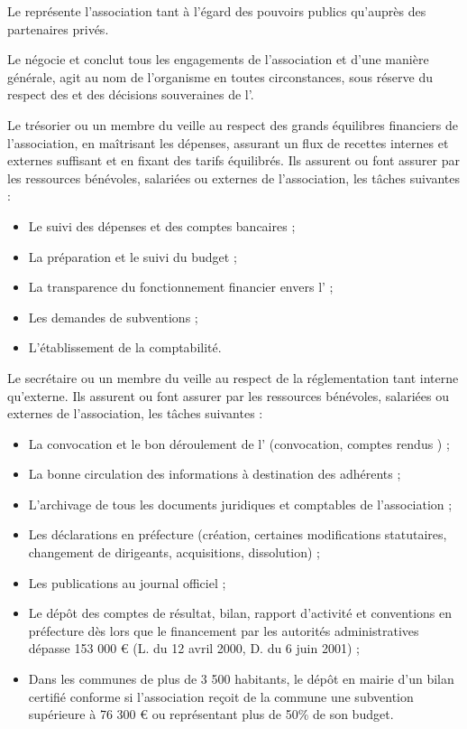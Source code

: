 Le \bureau{} représente l'association tant à l'égard des pouvoirs publics qu'auprès des partenaires privés.

Le \bureau{} négocie et conclut tous les engagements de l'association et d'une manière générale, agit au nom de l'organisme en toutes circonstances, sous réserve du respect des \statuts{} et des décisions souveraines de l'\AG{}.

Le trésorier ou un membre du \bureau{} veille au respect des grands équilibres financiers de l'association, en maîtrisant les dépenses, assurant un flux de recettes internes et externes suffisant et en fixant des tarifs équilibrés. Ils assurent ou font assurer par les ressources bénévoles, salariées ou externes de l'association, les tâches suivantes :
\begin{itemize}
\item Le suivi des dépenses et des comptes bancaires ;
\item La préparation et le suivi du budget ;
\item La transparence du fonctionnement financier envers l'\AG{} ;
\item Les demandes de subventions ;
\item L'établissement de la comptabilité.
\end{itemize}

Le secrétaire ou un membre du \bureau{} veille au respect de la réglementation tant interne qu'externe. Ils assurent ou font assurer par les ressources bénévoles, salariées ou externes de l'association, les tâches suivantes :
\begin{itemize}
\item La convocation et le bon déroulement de l'\AG{} (convocation, comptes rendus ) ;
\item La bonne circulation des informations à destination des adhérents ;
\item L'archivage de tous les documents juridiques et comptables de l'association ;
\item Les déclarations en préfecture (création, certaines modifications statutaires, changement de dirigeants, acquisitions, dissolution) ;
\item Les publications au journal officiel ;
\item Le dépôt des comptes de résultat, bilan, rapport d'activité et conventions en préfecture dès lors que le financement par les autorités administratives dépasse 153 000 \euro{} (L. du 12 avril 2000, D. du 6 juin 2001) ;
\item Dans les communes de plus de 3 500 habitants, le dépôt en mairie d'un bilan certifié conforme si l'association reçoit de la commune une subvention supérieure à 76 300 \euro{} ou représentant plus de 50\% de son budget.
\end{itemize}


